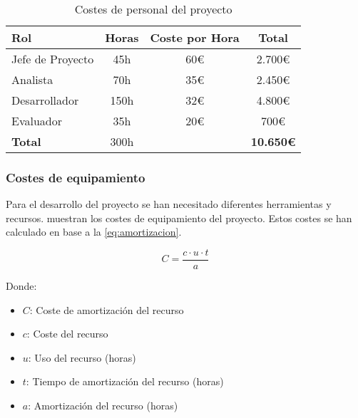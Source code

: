 \begin{table}[htbp]
    \centering
    \caption{Costes de personal del proyecto}
    \label{tab:costes_personal}
    \begin{tabular}{@{}lccc@{}}
    \toprule
    \textbf{Rol}     & \textbf{Horas} & \textbf{Coste por Hora} & \textbf{Total}   \\ \midrule
    Jefe de Proyecto & 45h            & 60\euro                 & 2.700\euro       \\
    Analista         & 70h            & 35\euro                 & 2.450\euro       \\
    Desarrollador    & 150h           & 32\euro                 & 4.800\euro       \\
    Evaluador        & 35h            & 20\euro                 & 700\euro         \\ \midrule
    \textbf{Total}   & 300h           &                         & \textbf{10.650\euro} \\ \bottomrule
    \end{tabular}
\end{table}

\subsubsection{Costes de equipamiento}
Para el desarrollo del proyecto se han necesitado diferentes herramientas y recursos.  muestran los costes de equipamiento del proyecto. Estos costes se han calculado en base a la \eqref{eq:amortizacion}. 

\begin{equation}
    C = \frac{c \cdot u \cdot t}{a}
    \label{eq:amortizacion}
\end{equation}


Donde:
\begin{itemize}
    \item $C$: Coste de amortización del recurso
    \item $c$: Coste del recurso
    \item $u$: Uso del recurso (horas)
    \item $t$: Tiempo de amortización del recurso (horas)
    \item $a$: Amortización del recurso (horas)
\end{itemize}

